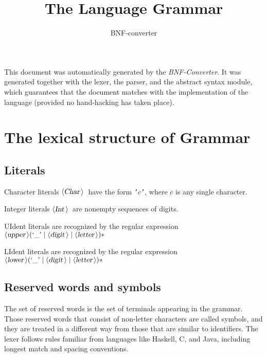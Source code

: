 \documentclass[a4paper,11pt]{article}
\title{The Language Grammar}
\author{BNF-converter}
\begin{document}
\maketitle


\newcommand{\emptyP}{\mbox{$\epsilon$}}
\newcommand{\terminal}[1]{\mbox{{\texttt {#1}}}}
\newcommand{\nonterminal}[1]{\mbox{$\langle \mbox{{\sl #1 }} \! \rangle$}}
\newcommand{\arrow}{\mbox{::=}}
\newcommand{\delimit}{\mbox{$|$}}
\newcommand{\reserved}[1]{\mbox{{\texttt {#1}}}}
\newcommand{\literal}[1]{\mbox{{\texttt {#1}}}}
\newcommand{\symb}[1]{\mbox{{\texttt {#1}}}}

This document was automatically generated by the {\em BNF-Converter}.
It was generated together with the lexer, the parser, and the
abstract syntax module, which guarantees that the document
matches with the implementation of the language
(provided no hand-hacking has taken place).

\section*{The lexical structure of Grammar}

\subsection*{Literals}
Character literals \nonterminal{Char}\ have the form
\terminal{'}$c$\terminal{'}, where $c$ is any single character.

Integer literals \nonterminal{Int}\ are nonempty sequences of digits.



UIdent literals are recognized by the regular expression
\({\nonterminal{upper}} (\mbox{`\_'} \mid {\nonterminal{digit}} \mid {\nonterminal{letter}})*\)

LIdent literals are recognized by the regular expression
\({\nonterminal{lower}} (\mbox{`\_'} \mid {\nonterminal{digit}} \mid {\nonterminal{letter}})*\)

\subsection*{Reserved words and symbols}
The set of reserved words is the set of terminals appearing in the grammar. Those reserved words that consist of non-letter characters are called symbols, and they are treated in a different way from those that are similar to identifiers. The lexer follows rules familiar from languages like Haskell, C, and Java, including longest match and spacing conventions.
\end{document}
